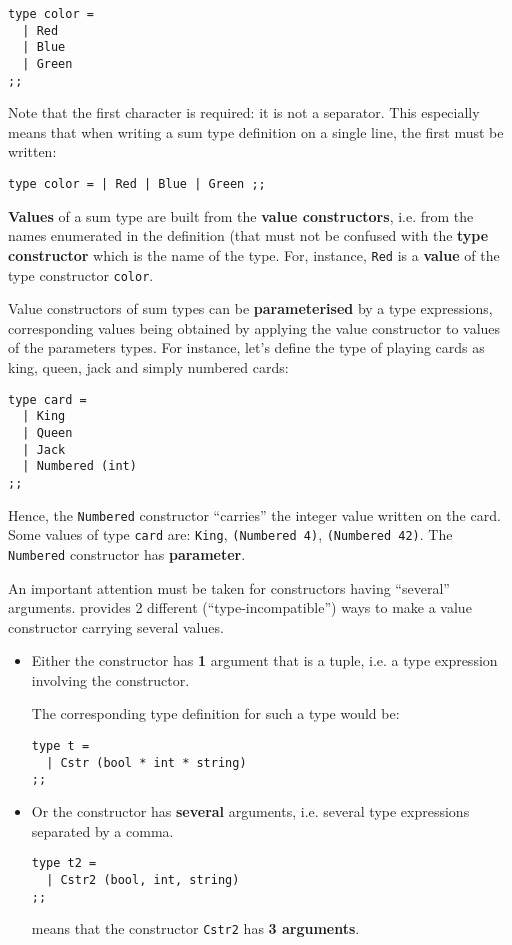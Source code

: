{\scriptsize
\begin{lstlisting}
type color =
  | Red
  | Blue
  | Green
;;
\end{lstlisting}
}
Note that the first \terminal{\vertical} character is required: it is not a
separator. This especially means that when writing a sum type
definition on a single line, the first \terminal{\vertical} must be written:

{\scriptsize
\begin{lstlisting}
type color = | Red | Blue | Green ;;
\end{lstlisting}
}

{\bf Values} of a sum type  are built from the
{\bf value constructors}, i.e. from the names enumerated in the
definition (that must not be confused with the {\bf type constructor}
which is the name of the type. For, instance,
{\tt Red} is a {\bf value} of the type constructor {\tt color}.


Value constructors of sum
types can be {\bf parameterised} by a type expressions, corresponding
values being obtained by applying the value constructor to values of
the parameters types. For instance, let's define the type of playing
cards as king, queen, jack and simply numbered cards:

{\scriptsize
\begin{lstlisting}
type card =
  | King
  | Queen
  | Jack
  | Numbered (int)
;;
\end{lstlisting}
} Hence, the {\tt Numbered} constructor ``carries'' the integer value
written on the card. Some values of type {\tt card} are: {\tt King},
{\tt (Numbered 4)}, {\tt (Numbered 42)}. The {\tt Numbered}
constructor has {\bf parameter}.

\medskip
An important attention must be taken for constructors having
``several'' arguments. {\focal} provides 2 different
(``type-incompatible'') ways to make a value constructor carrying
several values.
\begin{itemize}
\item Either the constructor has {\bf 1} argument that is a tuple,
  i.e. a type expression involving the {\tt *} constructor.

 The corresponding type definition for such a type would be:

{\scriptsize
\begin{lstlisting}
type t =
  | Cstr (bool * int * string)
;;
\end{lstlisting}
}

\item Or the constructor has {\bf several} arguments, i.e. several
  type expressions separated by a comma.
{\scriptsize
\begin{lstlisting}
type t2 =
  | Cstr2 (bool, int, string)
;;
\end{lstlisting}
}
means that the constructor {\tt Cstr2} has {\bf 3 arguments}.
\end{itemize}

